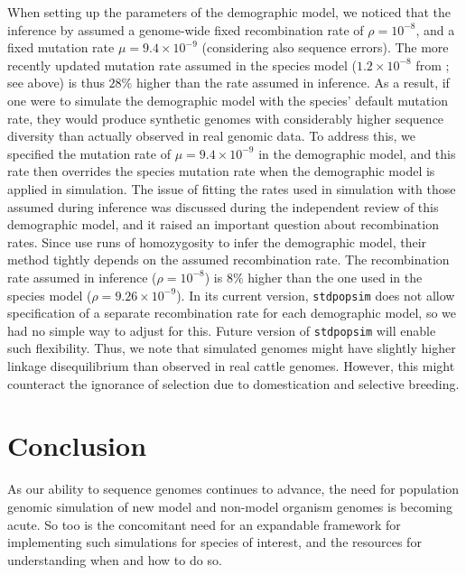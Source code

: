 \documentclass[hidelinks]{article}
\newcommand{\stdpopsim}{\texttt{stdpopsim}\xspace}
\begin{document}
When setting up the parameters of the demographic model, we noticed that the inference by \cite{MacLeod2013} assumed a genome-wide fixed recombination rate of \(\rho=10^{-8}\), and a fixed mutation rate \(\mu=9.4 \times 10^{-9}\) (considering also sequence errors).
%
The more recently updated mutation rate assumed in the species model (\(1.2\times 10^{-8}\) from  \citep{Harland2017}; see above) is thus \(28\%\) higher than the rate assumed in inference.
%
As a result, if one were to simulate the demographic model with the species' default mutation rate, they would produce synthetic genomes with considerably higher sequence diversity than actually observed in real genomic data.
%
To address this, we specified the mutation rate of \(\mu=9.4 \times 10^{-9}\) in the demographic model, and this rate then overrides the species mutation rate when the demographic model is applied in simulation.
%
%
The issue of fitting the rates used in simulation with those assumed during inference was discussed during the independent review of this demographic model, and it raised an important question about recombination rates. Since \cite{MacLeod2013} use runs of homozygosity to infer the demographic model, their method tightly depends on the assumed recombination rate. The recombination rate assumed in inference (\(\rho=10^{-8}\)) is \(8\%\) higher than the one used in the species model (\(\rho=9.26\times 10^{-9}\)). In its current version, \stdpopsim does not allow specification of a separate recombination rate for each demographic model, so we had no simple way to adjust for this. Future version of \stdpopsim will enable such flexibility. Thus, we note that simulated genomes might have slightly higher linkage disequilibrium than observed in real cattle genomes. However, this might counteract the ignorance of selection due to domestication and selective breeding.

\hypertarget{conclusion}{%
\section*{Conclusion}\label{conclusion}}

As our ability to sequence genomes continues to advance, the need for
population genomic simulation of new model and non-model organism genomes is
becoming acute. So too is the concomitant need for an expandable framework
for implementing such simulations for species of interest, and
the resources for understanding when and how to do so.
\end{document}
